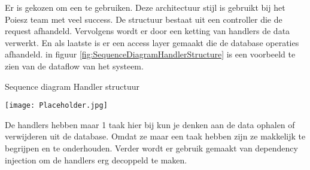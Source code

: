 \whitespace[2]
Er is gekozen om een  te gebruiken.
Deze architectuur stijl is gebruikt bij het Poiesz team met veel success.
De structuur bestaat uit een controller die de request afhandeld.
Vervolgens wordt er door een ketting van handlers de data verwerkt.
En als laatste is er een access layer gemaakt die de database operaties afhandeld.
in figuur \ref{fig:SequenceDiagramHandlerStructure} is een voorbeeld te zien van de dataflow van het systeem.

\begin{graphic}
    \captionsetup{type=figure}
    \caption{Sequence diagram Handler structuur}
    \texttt{[image: Placeholder.jpg]}
    \label{fig:SequenceDiagramHandlerStructure}
\end{graphic}

\whitespace
De handlers hebben maar 1 taak hier bij kun je denken aan de data ophalen of verwijderen uit de database.
Omdat ze maar een taak hebben zijn ze makkelijk te begrijpen en te onderhouden.
Verder wordt er gebruik gemaakt van dependency injection om de handlers erg decoppeld te maken.
